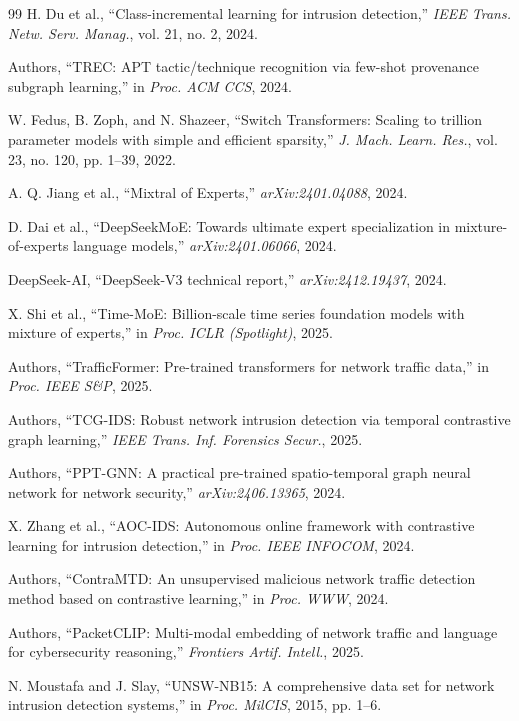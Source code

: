 \documentclass[journal]{IEEEtran}
\begin{document}
\begin{thebibliography}{99}
H. Du et al., ``Class-incremental learning for intrusion detection,'' \emph{IEEE Trans. Netw. Serv. Manag.}, vol. 21, no. 2, 2024.

Authors, ``TREC: APT tactic/technique recognition via few-shot provenance subgraph learning,'' in \emph{Proc. ACM CCS}, 2024.

W. Fedus, B. Zoph, and N. Shazeer, ``Switch Transformers: Scaling to trillion parameter models with simple and efficient sparsity,'' \emph{J. Mach. Learn. Res.}, vol. 23, no. 120, pp. 1--39, 2022.

A. Q. Jiang et al., ``Mixtral of Experts,'' \emph{arXiv:2401.04088}, 2024.

D. Dai et al., ``DeepSeekMoE: Towards ultimate expert specialization in mixture-of-experts language models,'' \emph{arXiv:2401.06066}, 2024.

DeepSeek-AI, ``DeepSeek-V3 technical report,'' \emph{arXiv:2412.19437}, 2024.

X. Shi et al., ``Time-MoE: Billion-scale time series foundation models with mixture of experts,'' in \emph{Proc. ICLR (Spotlight)}, 2025.

Authors, ``TrafficFormer: Pre-trained transformers for network traffic data,'' in \emph{Proc. IEEE S\&P}, 2025.

Authors, ``TCG-IDS: Robust network intrusion detection via temporal contrastive graph learning,'' \emph{IEEE Trans. Inf. Forensics Secur.}, 2025.

Authors, ``PPT-GNN: A practical pre-trained spatio-temporal graph neural network for network security,'' \emph{arXiv:2406.13365}, 2024.

X. Zhang et al., ``AOC-IDS: Autonomous online framework with contrastive learning for intrusion detection,'' in \emph{Proc. IEEE INFOCOM}, 2024.

Authors, ``ContraMTD: An unsupervised malicious network traffic detection method based on contrastive learning,'' in \emph{Proc. WWW}, 2024.

Authors, ``PacketCLIP: Multi-modal embedding of network traffic and language for cybersecurity reasoning,'' \emph{Frontiers Artif. Intell.}, 2025.

N. Moustafa and J. Slay, ``UNSW-NB15: A comprehensive data set for network intrusion detection systems,'' in \emph{Proc. MilCIS}, 2015, pp. 1--6.


\end{thebibliography}
\end{document}
